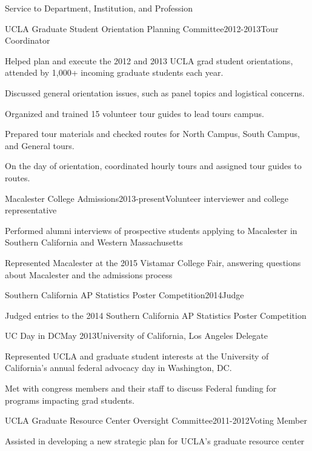 \documentclass{resume} %
\begin{document}
\begin{rSection}{Service to Department, Institution, and Profession}
\begin{rSubsection}{UCLA Graduate Student Orientation Planning Committee}{}{2012-2013}{Tour Coordinator}
\item Helped plan and execute the 2012 and 2013 UCLA grad student orientations, attended by 1,000+ incoming graduate students each year. 
\item Discussed general orientation issues, such as panel topics and logistical concerns.
\item Organized and trained 15 volunteer tour guides to lead tours campus.
\item Prepared tour materials and checked routes for North Campus, South Campus, and General tours.
\item On the day of orientation, coordinated hourly tours and assigned tour guides to routes.
\end{rSubsection}

\begin{rSubsection}{Macalester College Admissions}{}{2013-present}{Volunteer interviewer and college representative}
\item Performed alumni interviews of prospective students applying to Macalester in Southern California and Western Massachusetts 
\item Represented Macalester at the 2015 Vistamar College Fair, answering questions about Macalester and the admissions process
\end{rSubsection}

\begin{rSubsection}{Southern California AP Statistics Poster Competition}{}{2014}{Judge}
\item Judged entries to the 2014 Southern California AP Statistics Poster Competition
\end{rSubsection}

\begin{rSubsection}{UC Day in DC}{}{May 2013}{University of California, Los Angeles Delegate}
\item Represented UCLA and graduate student interests at the University of California's annual federal advocacy day in Washington, DC. 
\item Met with congress members and their staff to discuss Federal funding for programs impacting grad students. 
\end{rSubsection}

\begin{rSubsection}{UCLA Graduate Resource Center Oversight Committee}{}{2011-2012}{Voting Member}
\item Assisted in developing a new strategic plan for UCLA's graduate resource center
\end{rSubsection}



\end{rSection}
\end{document}
